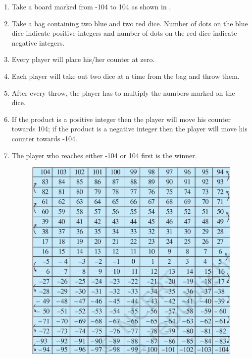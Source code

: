 \begin{enumerate}[label=\thesection.\arabic*, ref=\thesection.\theenumi]
	\item Take a board marked from -104 to 104 as shown in 
	.
	\item Take a bag containing two blue and two red dice.  Number of dots on the blue dice indicate positive integers and number of dots on the red dice indicate negative integers.
	\item Every player will place his/her counter at zero.
	\item Each player will take out two dice at a time from the bag and throw them.
	\item After every throw, the player has to multiply the numbers marked on the dice.
	\item If the product is a positive integer then the player will move his counter towards 104; if the product is a negative integer then the player will move his counter towards -104.
	\item The player who reaches either -104 or 104 first is the winner.
		\begin{figure}[H]
  \centering
  \includegraphics[width=\columnwidth]{figs/game1.jpg}
  \caption{}
  \label{fig:game1}
\end{figure}
\end{enumerate}
%
